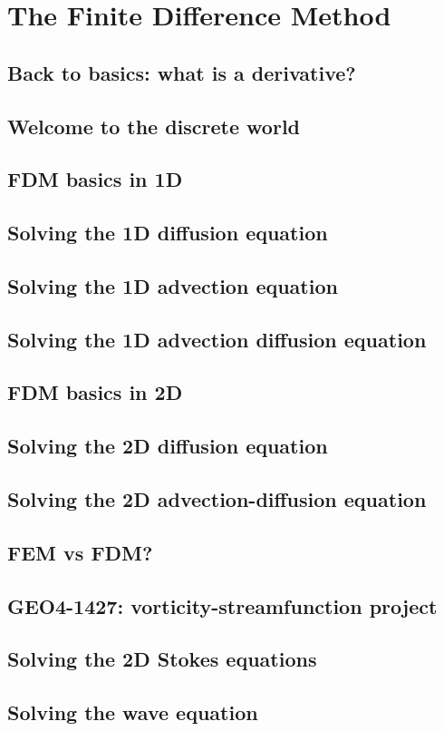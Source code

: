 \chapter{The Finite Difference Method} %

\section{Back to basics: what is a derivative?} 
\section{Welcome to the discrete world} 
\section{FDM basics in 1D} \label{ss:fdm_basics1D}  
\section{Solving the 1D diffusion equation} \label{ss:fdm_diff1D} 
\section{Solving the 1D advection equation} \label{ss:fdm_adv1D} 
\newpage
\section{Solving the 1D advection diffusion equation} 
\label{ss:fdm_advdiff1D} 
\newpage
\section{FDM basics in 2D} \label{ss:fdm_basics2D}  
\newpage
\section{Solving the 2D diffusion equation} \label{ss:fdm_diff2D} 
\section{Solving the 2D advection-diffusion equation} \label{ss:fdm_advdiff2D} 

\newpage
\section{FEM vs FDM?}\label{ss:femvsfdm}   
\newpage
\section{GEO4-1427: vorticity-streamfunction project} 
\newpage
\section{Solving the 2D Stokes equations} \label{ss:fdm_stokes2D} 
\newpage
\section{Solving the wave equation} \label{ss:fdm_wave_eq} 

